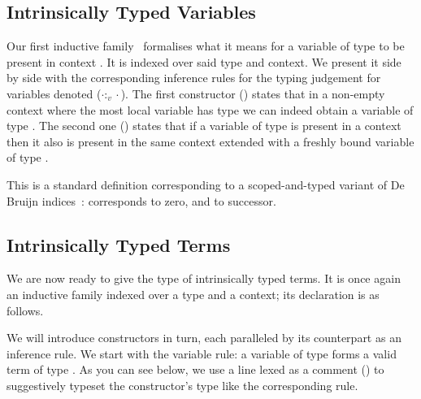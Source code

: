 \begin{AgdaSuppressSpace}
\end{AgdaSuppressSpace}

\subsection{Intrinsically Typed Variables}

Our first inductive family~\cite{DBLP:journals/fac/Dybjer94}  formalises
what it means for a variable of type  to be present in context .
It is indexed over said type and context.
We present it side by side
with the corresponding inference rules for the typing judgement
for variables denoted ($\cdot :_v \cdot$).
%
The first constructor () states that in a non-empty context
where the most local variable has type  we can indeed obtain a
variable of type .
%
The second one () states that if a variable of type 
is present in a context then it also is present in the same context
extended with a freshly bound variable of type .



This is a standard definition
corresponding to a scoped-and-typed variant of De Bruijn
indices~\cite{de1972lambda,DBLP:journals/scp/BellegardeH94,DBLP:conf/csl/AltenkirchR99,DBLP:journals/jfp/BirdP99}:
 corresponds to zero, and  to successor.

\subsection{Intrinsically Typed Terms}

We are now ready to give the type of intrinsically typed terms.
It is once again an inductive family indexed over a type and a
context; its declaration is as follows.


We will introduce constructors in turn, each paralleled by its
counterpart as an inference rule.
%
We start with the variable rule: a variable of type 
forms a valid term of type .
%
As you can see below, we use a line lexed as a comment (\AC{----})
to suggestively typeset the constructor's type like the
corresponding rule.


